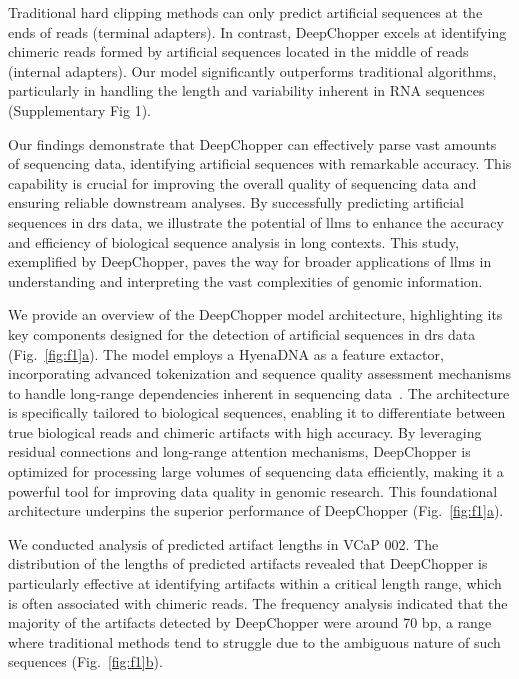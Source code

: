 \documentclass[pdflatex, sn-mathphys-num, lineno]{sn-jnl}%
\newcommand{\figref}[2]{Fig.~\hyperref[#1]{\ref*{#1}#2}}
\theoremstyle{thmstyleone}%
\theoremstyle{thmstyletwo}%
\theoremstyle{thmstylethree}%
\begin{document}
Traditional hard clipping methods can only predict artificial sequences at the ends of reads (terminal adapters).
In contrast, DeepChopper excels at identifying chimeric reads formed by artificial sequences located in the middle of reads (internal adapters).
Our model significantly outperforms traditional algorithms, particularly in handling the length and variability inherent in RNA sequences (Supplementary Fig 1).

Our findings demonstrate that DeepChopper can effectively parse vast amounts of sequencing data, identifying artificial sequences with remarkable accuracy.
This capability is crucial for improving the overall quality of sequencing data and ensuring reliable downstream analyses.
By successfully predicting artificial sequences in \gls{drs} data, we illustrate the potential of \glspl{llm} to enhance the accuracy and efficiency of biological sequence analysis in long contexts.
This study, exemplified by DeepChopper, paves the way for broader applications of \glspl{llm} in understanding and interpreting the vast complexities of genomic information.




We provide an overview of the DeepChopper model architecture, highlighting its key components designed for the detection of artificial sequences in \gls{drs} data (\figref{fig:f1}{a}).
The model employs a HyenaDNA as a feature extactor, incorporating advanced tokenization and sequence quality assessment mechanisms to handle long-range dependencies inherent in sequencing data~\cite{nguyen2024hyenadna}.
The architecture is specifically tailored to biological sequences, enabling it to differentiate between true biological reads and chimeric artifacts with high accuracy.
By leveraging residual connections and long-range attention mechanisms, DeepChopper is optimized for processing large volumes of sequencing data efficiently, making it a powerful tool for improving data quality in genomic research.
This foundational architecture underpins the superior performance of DeepChopper (\figref{fig:f1}{a}).


We conducted analysis of predicted artifact lengths in VCaP 002.
The distribution of the lengths of predicted artifacts revealed that DeepChopper is particularly effective at identifying artifacts within a critical length range, which is often associated with chimeric reads.
The frequency analysis indicated that the majority of the artifacts detected by DeepChopper were around 70 bp, a range where traditional methods tend to struggle due to the ambiguous nature of such sequences (\figref{fig:f1}{b}).
\end{document}
